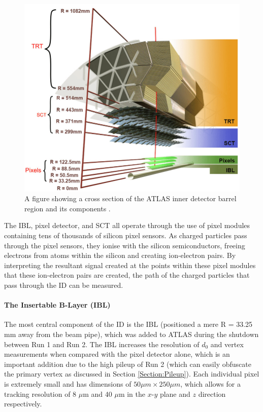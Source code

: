 \documentclass[12pt,a4paper,epsf,portrait,times,epsfig]{article}
\begin{document}
		\begin{figure}
			\centering
			\includegraphics[scale=0.4]{ATLAS_ID_Layers}
			\caption{A figure showing a cross section of the ATLAS inner detector barrel region and its components \cite{ATLASIDImage}.}
			\label{Fig:InnerDetectorXsec}
		\end{figure}

		The IBL, pixel detector, and SCT all operate through the use of pixel modules containing tens of thousands of silicon pixel sensors. As charged particles pass through the pixel sensors, they ionise with the silicon semiconductors, freeing electrons from atoms within the silicon and creating ion-electron pairs. By interpreting the resultant signal created at the points within these pixel modules that these ion-electron pairs are created, the path of the charged particles that pass through the ID can be measured. 

		\paragraph{The Insertable B-Layer (IBL)}\label{Section:IBL}

		The most central component of the ID is the IBL \cite{IBL-TDR} (positioned a mere R = 33.25 mm away from the beam pipe), which was added to ATLAS during the shutdown between Run 1 and Run 2. The IBL increases the resolution of $d_{0}$ and vertex measurements when compared with the pixel detector alone, which is an important addition due to the high pileup of Run 2 (which can easily obfuscate the primary vertex as discussed in Section \ref{Section:Pileup}). Each individual pixel is extremely small and has dimensions of $50 \mu m \times 250 \mu m$, which allows for a tracking resolution of 8 $\mu$m and 40 $\mu$m in the $x$-$y$ plane and $z$ direction respectively.  
\end{document}

